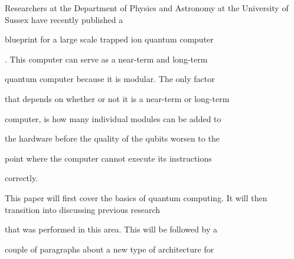 \documentclass[a4paper,portrait,12pt]{article}
\begin{document}
\begin{flushleft}
Researchers at the Department of Physics and Astronomy at the University of Sussex have recently published a
\end{flushleft}


\begin{flushleft}
blueprint for a large scale trapped ion quantum computer
\end{flushleft}


\begin{flushleft}
[5]. This computer can serve as a near-term and long-term
\end{flushleft}


\begin{flushleft}
quantum computer because it is modular. The only factor
\end{flushleft}


\begin{flushleft}
that depends on whether or not it is a near-term or long-term
\end{flushleft}


\begin{flushleft}
computer, is how many individual modules can be added to
\end{flushleft}


\begin{flushleft}
the hardware before the quality of the qubits worsen to the
\end{flushleft}


\begin{flushleft}
point where the computer cannot execute its instructions
\end{flushleft}


\begin{flushleft}
correctly.
\end{flushleft}


\begin{flushleft}
This paper will first cover the basics of quantum computing. It will then transition into discussing previous research
\end{flushleft}


\begin{flushleft}
that was performed in this area. This will be followed by a
\end{flushleft}


\begin{flushleft}
couple of paragraphs about a new type of architecture for
\end{flushleft}
\end{document}
